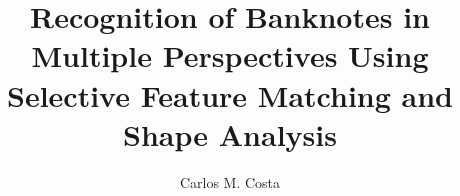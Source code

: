 









\mainmatter
\title{Recognition of Banknotes in Multiple Perspectives Using Selective Feature Matching and Shape Analysis}

\author{Carlos M. Costa}


\maketitle










%









